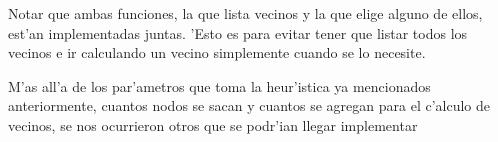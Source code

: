 Notar que ambas funciones, la que lista vecinos y la que elige alguno de ellos, est'an implementadas juntas. 'Esto es para evitar tener que listar todos los vecinos e ir calculando un vecino simplemente cuando se lo necesite.


M'as all'a de los par'ametros que toma la heur'istica ya mencionados anteriormente, cuantos nodos se sacan y cuantos se agregan para el c'alculo de vecinos, se nos ocurrieron otros que se podr'ian llegar implementar

